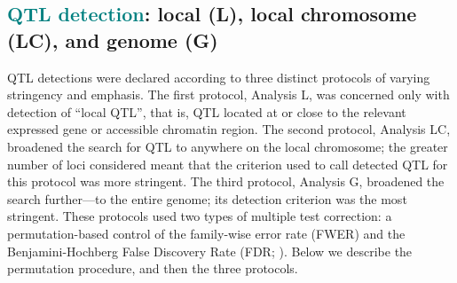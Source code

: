 \documentclass[9pt,twocolumn,twoside]{gsajnl}
\newcommand{\eg}{\emph{e.g.}\xspace}
\newcommand{\GKinline}[1]{\textcolor{teal}{#1}}
\begin{document}


\subsection{\GKinline{QTL detection}: local (L), local chromosome (LC), and genome (G)}

QTL detections were declared according to three distinct protocols of varying stringency and emphasis. The first protocol, Analysis L, was concerned only with detection of ``local QTL'', that is, QTL located at or close to the relevant expressed gene or accessible chromatin region.
The second protocol, Analysis LC, broadened the search for QTL to anywhere on the local chromosome; the greater number of loci considered meant that the criterion used to call detected QTL for this protocol was more stringent.
The third protocol, Analysis G, broadened the search further---to the entire genome; its detection criterion was the most stringent.
These protocols used two types of multiple test correction: a permutation-based control of the family-wise error rate (FWER) and the Benjamini-Hochberg False Discovery Rate (FDR; \citealt{Benjamini1995}). Below we describe the permutation procedure, and then the three protocols.
\end{document}

